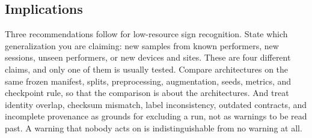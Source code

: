 \subsection{Implications}

Three recommendations follow for low-resource sign recognition. State which generalization you are claiming: new samples from known performers, new sessions, unseen performers, or new devices and sites. These are four different claims, and only one of them is usually tested. Compare architectures on the same frozen manifest, splits, preprocessing, augmentation, seeds, metrics, and checkpoint rule, so that the comparison is about the architectures. And treat identity overlap, checksum mismatch, label inconsistency, outdated contracts, and incomplete provenance as grounds for excluding a run, not as warnings to be read past. A warning that nobody acts on is indistinguishable from no warning at all.